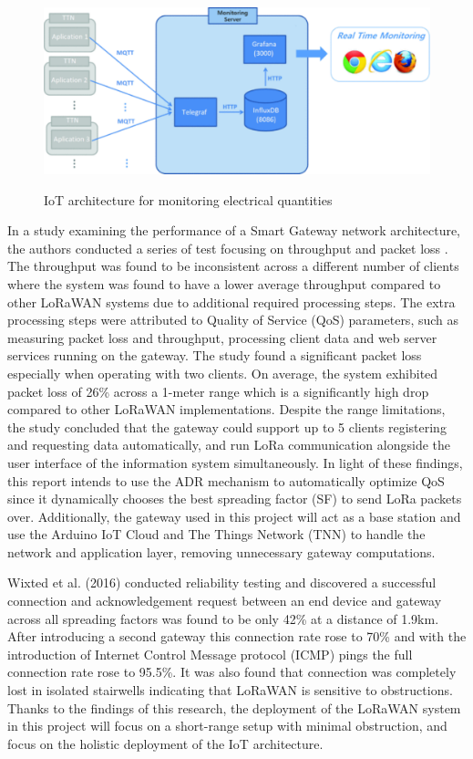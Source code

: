 \begin{figure}[h]
	\centering
	\caption{IoT architecture for monitoring electrical quantities \cite{Monitoring-Electric-Parameters}}
	\includegraphics[scale=0.5]{Sections/Literature-Review/Electrical-Monitoring-System.pdf}
	\label{Electrical-Monitoring-System}
\end{figure}

In a study examining the performance of a Smart Gateway network architecture, the authors conducted a series of test focusing on throughput and packet loss \cite{Monitoring-System-Smart-Gateway}. The throughput was found to be inconsistent across a different number of clients where the system was found to have a lower average throughput compared to other LoRaWAN systems due to additional required processing steps. The extra processing steps were attributed to Quality of Service (QoS) parameters, such as measuring packet loss and throughput, processing client data and web server services running on the gateway. The study found a significant packet loss especially when operating with two clients. On average, the system exhibited packet loss of 26\% across a 1-meter range which is a significantly high drop compared to other LoRaWAN implementations. Despite the range limitations, the study concluded that the gateway could support up to 5 clients registering and requesting data automatically, and run LoRa communication alongside the user interface of the information system simultaneously. In light of these findings, this report intends to use the ADR mechanism to automatically optimize QoS since it dynamically chooses the best spreading factor (SF) to send LoRa packets over. Additionally, the gateway used in this project will act as a base station and use the Arduino IoT Cloud and The Things Network (TNN) to handle the network and application layer, removing unnecessary gateway computations. 

Wixted et al. (2016) \cite{LoRa-WSN} conducted reliability testing and discovered a successful connection and acknowledgement request between an end device and gateway across all spreading factors was found to be only 42\% at a distance of 1.9km. After introducing a second gateway this connection rate rose to 70\% and with the introduction of Internet Control Message protocol (ICMP) pings the full connection rate rose to 95.5\%. It was also found that connection was completely lost in isolated stairwells indicating that LoRaWAN is sensitive to obstructions. Thanks to the findings of this research, the deployment of the LoRaWAN system in this project will focus on a short-range setup with minimal obstruction, and focus on the holistic deployment of the IoT architecture. 

